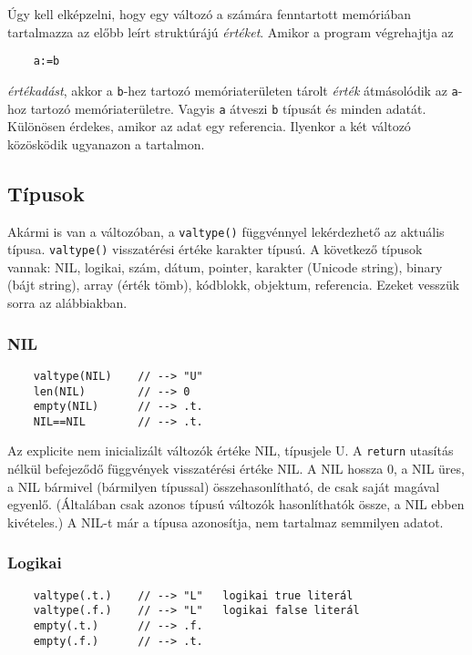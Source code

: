 Úgy kell elképzelni, hogy egy változó a számára fenntartott memóriában
tartalmazza az előbb leírt struktúrájú {\em értéket}. Amikor a program
végrehajtja az 

\begin{verbatim}
    a:=b
\end{verbatim}
{\em értékadást}, akkor a \verb!b!-hez tartozó memóriaterületen tárolt {\em érték\/}
átmásolódik az \verb!a!-hoz tartozó memóriaterületre. Vagyis \verb!a! átveszi 
\verb!b! típusát és minden adatát.  Különösen érdekes, amikor az adat egy referencia.
Ilyenkor a két változó közösködik ugyanazon a tartalmon.


\subsection{Típusok}

Akármi is van a változóban,
a \verb!valtype()! függvénnyel lekérdezhető az aktuális típusa. 
\verb!valtype()! visszatérési értéke karakter típusú. 
A következő típusok vannak: 
NIL, logikai, szám, dátum, pointer, karakter (Unicode string),
binary (bájt string), array (érték tömb), kódblokk, objektum, referencia. 
Ezeket vesszük sorra az alábbiakban.


\subsubsection{NIL}
\begin{verbatim}
    valtype(NIL)    // --> "U"
    len(NIL)        // --> 0
    empty(NIL)      // --> .t.
    NIL==NIL        // --> .t.
\end{verbatim}

Az explicite nem inicializált változók értéke NIL, típusjele U.
A \verb!return! utasítás nélkül befejeződő függvények visszatérési
értéke NIL. A NIL hossza 0, a NIL üres, a NIL bármivel (bármilyen típussal)  
összehasonlítható, de csak saját magával egyenlő. (Általában
csak azonos típusú változók hasonlíthatók össze, a NIL ebben kivételes.)
A NIL-t már a típusa azonosítja, nem tartalmaz semmilyen adatot.


\subsubsection{Logikai}
\begin{verbatim}
    valtype(.t.)    // --> "L"   logikai true literál
    valtype(.f.)    // --> "L"   logikai false literál
    empty(.t.)      // --> .f.
    empty(.f.)      // --> .t.
\end{verbatim}

